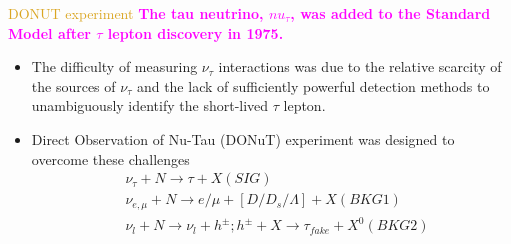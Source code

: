 \documentclass[11pt]{beamer} %
\renewcommand{\(}{\begin{columns}}
\renewcommand{\)}{\end{columns}}
\newcommand{\<}[1]{\begin{column}{#1}}
\renewcommand{\>}{\end{column}}
\newcommand{\itt}{\begin{itemize}}
\newcommand{\tti}{\end{itemize}}
\newcommand{\hlt}[2]{\textcolor{#1}{\textbf{#2}}}
\begin{document}
\begin{frame}{\textcolor{Goldenrod}{DONUT experiment}}
  \hlt{Magenta}{The tau neutrino, $nu_{\tau}$, was added to the Standard Model
    after $\tau$ lepton discovery in 1975.}
  \itt
\item<2-> The difficulty of measuring $\nu_{\tau}$
  interactions was due to the relative scarcity of the sources of $\nu_{\tau}$ and
  the lack of sufficiently powerful detection methods to unambiguously
  identify the short-lived $\tau$ lepton.
  
\item<3-> Direct Observation of Nu-Tau (DONuT) experiment was designed to
  overcome these challenges
  \[
    \begin{aligned}
      &\nu_{\tau} + N \to \tau + X (SIG)\\
      & \nu_{e,\mu} + N \to e/\mu +  [D/D_s/\Lambda] + X (BKG 1)\\
      & \nu_l + N \to \nu_l + h^{\pm} ; h^{\pm}  + X \to \tau_{fake} +
      X^0 (BKG 2)\\
    \end{aligned}
  \]
  \tti    
\end{frame}
\end{document}
